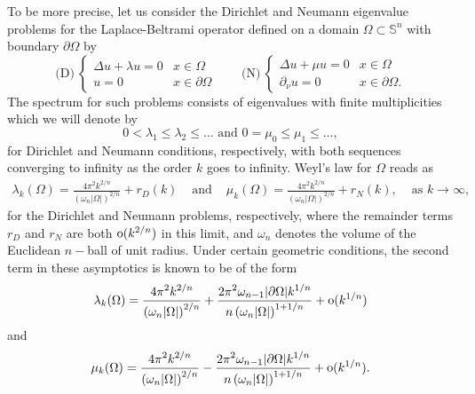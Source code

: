 \documentclass[11pt,a4paper,times]{amsart}
\theoremstyle{plain}
\theoremstyle{definition}
\numberwithin{equation}{section}
\newcommand{\ds}{\displaystyle}
\newcommand{\Se}{\mathbb{S}}
\newcommand{\so}{{\rm o}}
\newcommand{\fr}[2]{\frac{\ds #1}{\ds #2}}
\begin{document}
To be more precise, let us consider the Dirichlet and Neumann eigenvalue problems for the Laplace-Beltrami
operator defined on a domain $\Omega\subset\Se^n$ with boundary $\partial \Omega$ by
\begin{equation}\label{eigprob}
\mbox{(D)}~ \left\{\begin{array}{ll}
\Delta u+\lambda u=0& x\in\Omega\\
u=0 & x\in\partial \Omega
\end{array}\right.
\quad\quad
\mbox{(N)}~\left\{\begin{array}{ll}
\Delta u+\mu u=0& x\in\Omega\\
\partial_{\nu}u=0 & x\in\partial \Omega.
\end{array}\right.
\end{equation}
The spectrum for such problems consists of eigenvalues with finite multiplicities which we will denote by
\[
 0 < \lambda_{1} \leq \lambda_{2} \leq \dots  \mbox{ and } 0=\mu_{0} \leq \mu_{1}\leq \dots,
\]
for Dirichlet and Neumann conditions, respectively, with both sequences converging to infinity as the order $k$
goes to infinity. Weyl's law for $\Omega$ reads as
\begin{equation}\label{weyl1}
\begin{array}{llll}
\lambda_{k}\left(\Omega\right) = \fr{4\pi^2 k^{2/n}}{\left(\omega_{n}|\Omega|\right)^{2/n}} + r_{D}(k) &
\mbox{ and } &
\mu_{k}\left(\Omega\right) = \fr{4\pi^2 k^{2/n}}{\left(\omega_{n}|\Omega|\right)^{2/n}} + r_{N}(k), & \mbox{ as } k\to\infty,
\end{array}
\end{equation}
for the Dirichlet and Neumann problems, respectively, where the remainder terms $r_{D}$ and $r_{N}$ are both $\so(k^{2/n})$ in this limit,
and $\omega_{n}$ denotes the
volume of the Euclidean $n-$ball of unit radius. Under certain geometric conditions, the second term in these
asymptotics is known to be of the form
\begin{equation}\label{2termweyl}
\lambda_{k}(\Omega) = \frac{\ds 4\pi^2k^{2/n}}{\ds \left(\omega_{n}|\Omega|\right)^{2/n}}
 + \frac{\ds 2\pi^2\omega_{n-1}|\partial\Omega|k^{1/n}}{\ds n \left(\omega_{n}|\Omega|\right)^{1+1/n}}+ {\rm o}(k^{1/n})
\end{equation}
and
\begin{equation}\label{2termweylNeumann}
 \mu_{k}(\Omega) = \frac{\ds 4\pi^2k^{2/n}}{\ds \left(\omega_{n}|\Omega|\right)^{2/n}}
 - \frac{\ds 2\pi^2\omega_{n-1}|\partial\Omega|k^{1/n}}{\ds n \left(\omega_{n}|\Omega|\right)^{1+1/n}}+ {\rm o}(k^{1/n}).
\end{equation}
\end{document}
